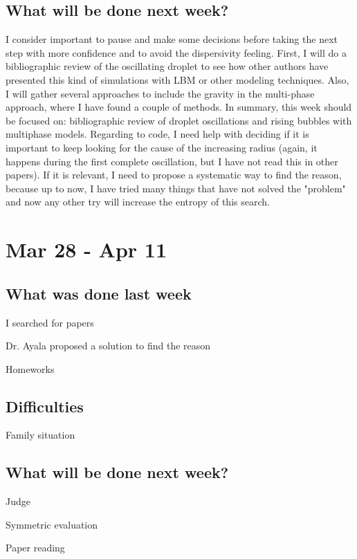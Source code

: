 \documentclass[12pt]{article}
\begin{document}
	\subsection*{What will be done next week?}
	I consider important to pause and make some decisions before taking the next step with more confidence and to avoid the dispersivity feeling. First, I will do a bibliographic review of the oscillating droplet to see how other authors have presented this kind of simulations with LBM or other modeling techniques. Also, I will gather several approaches to include the gravity in the multi-phase approach, where I have found a couple of methods. In summary, this week should be focused on: bibliographic review of droplet oscillations and rising bubbles with multiphase models. Regarding to code, I need help with deciding if it is important to keep looking for the cause of the increasing radius (again, it happens during the first complete oscillation, but I have not read this in other papers). If it is relevant, I need to propose a systematic way to find the reason, because up to now, I have tried many things that have not solved the "problem" and now any other try will increase the entropy of this search.
	
	\pagebreak
	\section*{Mar 28 - Apr 11}
	\subsection*{What was done last week}
	I searched for papers 
	
	Dr. Ayala proposed a solution to find the reason 
	
	Homeworks
	
	
	\subsection*{Difficulties}
	
	Family situation 
	\subsection*{What will be done next week?}
	
	Judge
	
	Symmetric evaluation
	
	Paper reading
	
	
	
	
	\printbibliography %
\end{document}
